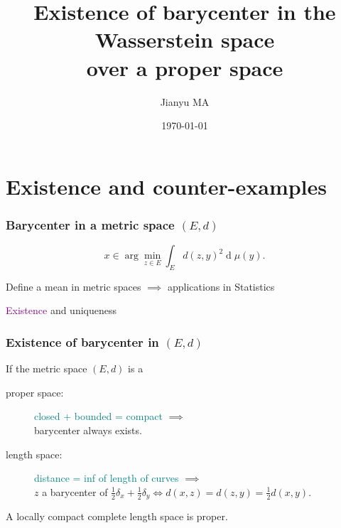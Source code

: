 \documentclass[aspectratio=169]{beamer}
\title{Existence of barycenter in the Wasserstein space\\ over a proper space}
\author{Jianyu MA}
\date{\today}
\newcommand{\diff}{\operatorname{d}}
\begin{document}
\frame{\titlepage}

\section{Existence and counter-examples}
\begin{frame}
	\frametitle{Barycenter in a metric space $(E,d)$}
	\begin{definition}
		\[
			x \in \arg\min_{z \in E} \int_{E} d(z,y)^2 \diff \mu(y).
		\]
	\end{definition}
	\begin{description}
		\item<2>[Motivation] Define a mean in metric spaces $\implies$ applications in Statistics
		\item<3>[Questions] \textcolor{purple}{Existence} and uniqueness
	\end{description}
\end{frame}

\begin{frame}
	\frametitle{Existence of barycenter in $(E,d)$}
	If the metric space $(E,d)$ is a
	\begin{description}
		\item[proper space:] \textcolor{teal}{closed + bounded = compact} $\implies$ \\[0.1cm]
			barycenter always exists.
		\item[length space:] \textcolor{teal}{distance = inf of length of curves} $\implies$ \\[0.1cm]
			$z$ a barycenter of $\frac{1}{2}\delta_x + \frac{1}{2}\delta_y \Longleftrightarrow
				d(x,z)=d(z,y) = \frac{1}{2}d(x,y)$.
	\end{description}
	\pause
	\vfill
	\begin{theorem}
		A locally compact complete length space is proper.
	\end{theorem}
\end{frame}
\end{document}
